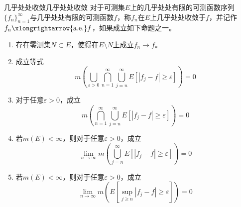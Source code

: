 \documentclass[lang = cn, scheme = chinese, thmcnt = section]{elegantbook}
\newcommand{\sub}{\subset}             %
\newcommand{\toae}{\xlongrightarrow{\mathrm{a.e.}}}
\begin{document}
\begin{definition}{几乎处处收敛}{几乎处处收敛}
	对于可测集$E$上的几乎处处有限的可测函数序列$\{f_n\}_{n=1}^{\infty}$与几乎处处有限的可测函数$f$，称$f_n$在$E$上几乎处处收敛于$f$，并记作$f_n\toae f$，如果成立如下命题之一。
	\begin{enumerate}
		\item 存在零测集$N\sub E$，使得在$E\setminus N$上成立$f_n\to f$。
		\item 成立等式%
		$$
		m\left(\bigcup_{\varepsilon>0}\bigcap_{n=1}^{\infty}\bigcup_{j=n}^{\infty}E[ |f_j-f|\ge \varepsilon ]\right)=0
		$$
		\item 对于任意$\varepsilon> 0$，成立
		$$
		m\left(\bigcap_{n=1}^{\infty}\bigcup_{j=n}^{\infty}E[|f_j-f|\ge \varepsilon]\right)=0
		$$
		\item 若$m(E)<\infty$，则对于任意$\varepsilon> 0$，成立%
		$$
		\lim_{n\to\infty}m\left(\bigcup_{j=n}^{\infty}E[|f_j-f|\ge \varepsilon]\right)=0
		$$
		\item 若$m(E)<\infty$，则对于任意$\varepsilon> 0$，成立%
		$$
		\lim_{n\to\infty}m\left(E\left[\sup_{j\ge n}|f_j-f|\ge \varepsilon\right]\right)=0
		$$
	\end{enumerate}
\end{definition}
\end{document}

